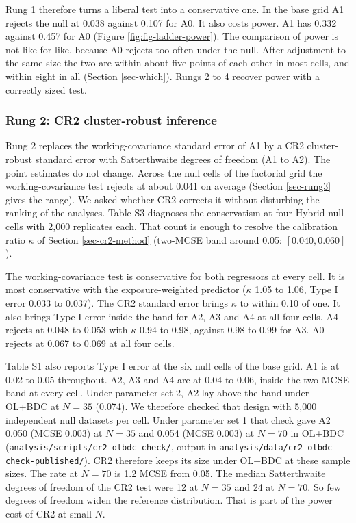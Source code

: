 \documentclass[
  11pt,
]{article}
\begin{document}
Rung 1 therefore turns a liberal test into a conservative one. In the
base grid A1 rejects the null at 0.038 against
0.107 for A0. It also costs power. A1 has
0.332 against 0.457 for A0
(Figure \ref{fig:fig-ladder-power}). The comparison of power is not
like for like, because A0 rejects too often under the null.
After adjustment to the same size the two are within about five
points of each other in most cells, and within eight in all (Section
\ref{sec-which}). Rungs 2 to 4 recover power with a correctly sized
test.

\subsubsection{Rung 2: CR2 cluster-robust inference}\label{sec-rung2}

Rung 2 replaces the working-covariance standard error of A1 by a CR2
cluster-robust standard error with Satterthwaite degrees of freedom
(A1 to A2). The point estimates do not change. Across the null cells
of the factorial grid the working-covariance test rejects at about
0.041 on average (Section
\ref{sec-rung3} gives the range). We asked whether CR2 corrects it
without disturbing the ranking of the analyses. Table S3 diagnoses
the conservatism at four Hybrid null cells with 2,000 replicates each.
That count is enough to resolve the calibration ratio \(\kappa\) of
Section \ref{sec-cr2-method} (two-MCSE band around 0.05:
\([0.040, 0.060]\)).

The working-covariance test is conservative for both regressors at
every cell. It is most conservative with the exposure-weighted
predictor (\(\kappa\) 1.05 to 1.06, Type I error
0.033 to 0.037). The CR2 standard error brings
\(\kappa\) to within 0.10 of one. It also brings Type I error inside
the band for A2, A3 and A4 at all four cells. A4 rejects at
0.048 to 0.053 with \(\kappa\)
0.94 to 0.98, against
0.98 to 0.99 for A3. A0 rejects at
0.067 to 0.069 at all four cells.

Table S1 also reports Type I error at the six null cells of the base
grid. A1 is at 0.02 to 0.05 throughout. A2, A3 and A4 are
at 0.04 to 0.06, inside the
two-MCSE band at every cell. Under parameter set 2, A2 lay above the
band under OL+BDC at \(N = 35\) (0.074). We therefore checked that
design with 5,000 independent null datasets per cell. Under parameter
set 1 that check gave A2
0.050 (MCSE
0.003) at \(N = 35\) and
0.054 (MCSE
0.003) at \(N = 70\) in OL+BDC
(\texttt{analysis/scripts/cr2-olbdc-check/}, output in
\texttt{analysis/data/cr2-olbdc-check-published/}). CR2 therefore keeps its
size under OL+BDC at these sample sizes. The rate at \(N = 70\) is
1.2
MCSE from 0.05.
The median Satterthwaite degrees of freedom of the CR2 test were
12 at \(N = 35\) and
24 at \(N = 70\). So few
degrees of freedom widen the reference distribution. That is part of
the power cost of CR2 at small \(N\).
\end{document}
